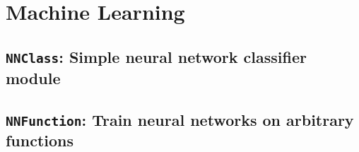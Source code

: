 \chapter{Machine Learning}

	\section{\texttt{NNClass}: Simple neural network classifier module}

	\section{\texttt{NNFunction}: Train neural networks on arbitrary functions}



